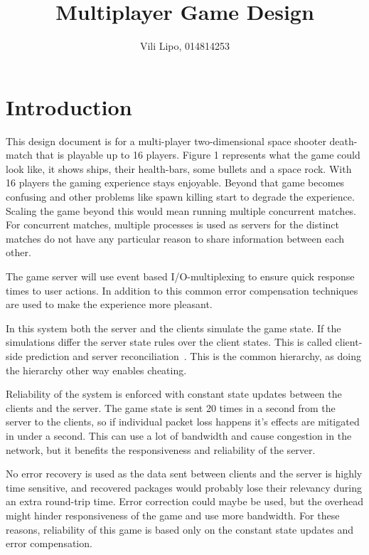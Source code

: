 \documentclass[10pt,a4paper]{article}
\author{Vili Lipo, 014814253}
\title{Multiplayer Game Design}
\begin{document}
 \maketitle
 \thispagestyle{plain}
 \section{Introduction}

 This design document is for a multi-player two-dimensional space shooter
 death-match that is playable up to 16 players.  Figure 1 represents what the
 game could look like, it shows ships, their health-bars, some bullets and a
 space rock.  With 16 players the gaming experience stays enjoyable. Beyond
 that game becomes confusing and other problems like spawn killing start to
 degrade the experience. Scaling the game beyond this would mean running
 multiple concurrent matches. For concurrent matches, multiple processes is
 used as servers for the distinct matches do not have any particular reason
 to share information between each other.
 
 The game server will use event based I/O-multiplexing to ensure quick response
 times to user actions. In addition to this common error compensation
 techniques are used to make the experience more pleasant.

 In this system both the server and the clients simulate the game state. If the
 simulations differ the server state rules over the client states.  This is
 called  client-side prediction and server reconciliation~\cite{gambetta_fast}.
 This is the common hierarchy, as doing the hierarchy other way enables
 cheating.

 Reliability of the system is enforced with constant state updates between the
 clients and the server. The game state is sent 20 times in a second from the
 server to the clients, so if individual packet loss happens it's effects are
 mitigated in under a second. This can use a lot of bandwidth and cause
 congestion in the network, but it benefits the responsiveness and reliability
 of the server.

 No error recovery is used as the data sent between clients and the server is
 highly time sensitive, and recovered packages would probably lose their
 relevancy during an extra round-trip time. Error correction could maybe be
 used, but the overhead might hinder responsiveness of the game and use more
 bandwidth. For these reasons, reliability of this game is based only on the
 constant state updates and error compensation.
\end{document}
